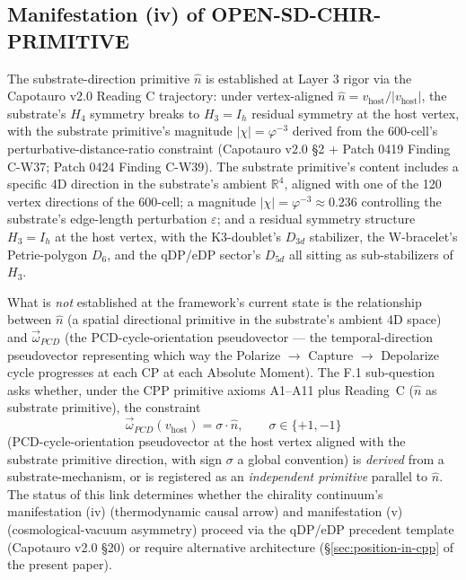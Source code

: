 \documentclass[11pt,letterpaper]{article}
\newcommand{\phig}{\varphi}
\newcommand{\vhost}{v_{\text{host}}}
\newcommand{\omegaPCD}{\vec{\omega}_{PCD}}
\begin{document}
\subsection{Manifestation (iv) of OPEN-SD-CHIR-PRIMITIVE}
\label{sec:manifestation-iv}

The substrate-direction primitive $\hat{n}$ is established at Layer 3 rigor via the Capotauro v2.0 Reading C trajectory: under vertex-aligned $\hat{n} = \vhost / |\vhost|$, the substrate's $H_4$ symmetry breaks to $H_3 = I_h$ residual symmetry at the host vertex, with the substrate primitive's magnitude $|\chi| = \phig^{-3}$ derived from the 600-cell's perturbative-distance-ratio constraint (Capotauro v2.0 \S2 + Patch 0419 Finding C-W37; Patch 0424 Finding C-W39). The substrate primitive's content includes a specific 4D direction in the substrate's ambient $\mathbb{R}^4$, aligned with one of the 120 vertex directions of the 600-cell; a magnitude $|\chi| = \phig^{-3} \approx 0.236$ controlling the substrate's edge-length perturbation $\varepsilon$; and a residual symmetry structure $H_3 = I_h$ at the host vertex, with the K3-doublet's $D_{3d}$ stabilizer, the W-bracelet's Petrie-polygon $D_6$, and the qDP/eDP sector's $D_{5d}$ all sitting as sub-stabilizers of $H_3$.

What is \emph{not} established at the framework's current state is the relationship between $\hat{n}$ (a spatial directional primitive in the substrate's ambient 4D space) and $\omegaPCD$ (the PCD-cycle-orientation pseudovector --- the temporal-direction pseudovector representing which way the Polarize $\to$ Capture $\to$ Depolarize cycle progresses at each CP at each Absolute Moment). The F.1 sub-question asks whether, under the CPP primitive axioms A1--A11 plus Reading~C ($\hat{n}$ as substrate primitive), the constraint
\begin{equation}
\omegaPCD(\vhost) = \sigma \cdot \hat{n}, \qquad \sigma \in \{+1, -1\}
\label{eq:link-constraint}
\end{equation}
(PCD-cycle-orientation pseudovector at the host vertex aligned with the substrate primitive direction, with sign $\sigma$ a global convention) is \emph{derived} from a substrate-mechanism, or is registered as an \emph{independent primitive} parallel to $\hat{n}$. The status of this link determines whether the chirality continuum's manifestation (iv) (thermodynamic causal arrow) and manifestation (v) (cosmological-vacuum asymmetry) proceed via the qDP/eDP precedent template (Capotauro v2.0 \S20) or require alternative architecture (\S\ref{sec:position-in-cpp} of the present paper).
\end{document}

